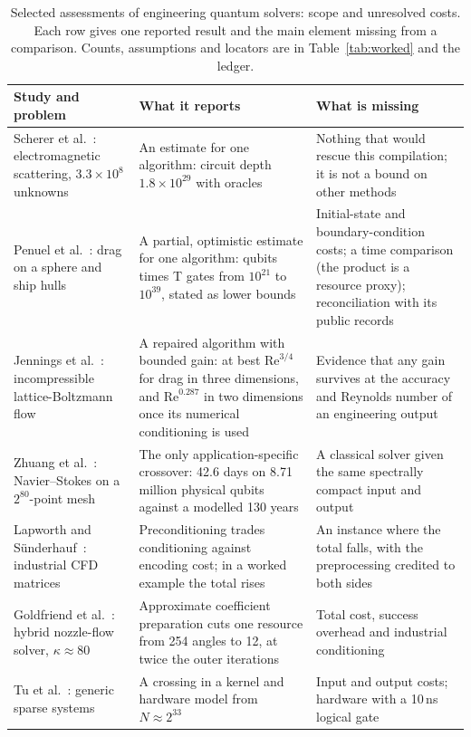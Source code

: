\begin{table}[htbp]
\centering\small
\caption{Selected assessments of engineering quantum solvers: scope and unresolved costs. Each row gives one reported result and the main element missing from a comparison. Counts, assumptions and locators are in Table~\ref{tab:worked} and the ledger.}\label{tab:linstudies}
\begin{tabular}{@{}L{3.4cm} L{6.6cm} L{5.8cm}@{}}
\toprule
Study and problem & What it reports & What is missing\\\midrule
Scherer et al.~\cite{scherer2017}: electromagnetic scattering, $3.3\times10^8$ unknowns & An estimate for one algorithm: circuit depth $1.8\times10^{29}$ with oracles & Nothing that would rescue this compilation; it is not a bound on other methods\\
Penuel et al.~\cite{penuel2025}: drag on a sphere and ship hulls & A partial, optimistic estimate for one algorithm: qubits times T gates from $10^{21}$ to $10^{39}$, stated as lower bounds & Initial-state and boundary-condition costs; a time comparison (the product is a resource proxy); reconciliation with its public records\\
Jennings et al.~\cite{jennings2025}: incompressible lattice-Boltzmann flow & A repaired algorithm with bounded gain: at best $\mathrm{Re}^{3/4}$ for drag in three dimensions, and $\mathrm{Re}^{0.287}$ in two dimensions once its numerical conditioning is used & Evidence that any gain survives at the accuracy and Reynolds number of an engineering output\\
Zhuang et al.~\cite{zhuang2025}: Navier--Stokes on a $2^{80}$-point mesh & The only application-specific crossover: 42.6 days on 8.71 million physical qubits against a modelled 130 years & A classical solver given the same spectrally compact input and output\\
Lapworth and S\"underhauf~\cite{lapworth2025}: industrial CFD matrices & Preconditioning trades conditioning against encoding cost; in a worked example the total rises & An instance where the total falls, with the preprocessing credited to both sides\\
Goldfriend et al.~\cite{goldfriend2026}: hybrid nozzle-flow solver, $\kappa\approx80$ & Approximate coefficient preparation cuts one resource from 254 angles to 12, at twice the outer iterations & Total cost, success overhead and industrial conditioning\\
Tu et al.~\cite{tu2025}: generic sparse systems & A crossing in a kernel and hardware model from $N\approx2^{33}$ & Input and output costs; hardware with a 10\,ns logical gate\\
\bottomrule
\end{tabular}
\end{table}

